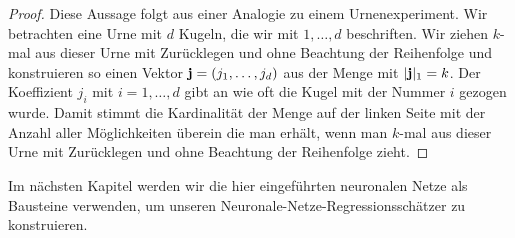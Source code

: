 \begin{proof}
Diese Aussage folgt aus einer Analogie zu einem Urnenexperiment. Wir betrachten eine Urne mit $d$ Kugeln, die wir mit $1,\dots,d$ beschriften. Wir ziehen $k$-mal aus dieser Urne mit Zurücklegen und ohne Beachtung der Reihenfolge und konstruieren so einen Vektor $\mathbf{j} = (j_1,\dots,j_d)$ aus der Menge mit $|\mathbf{j}|_1 = k$. Der Koeffizient $j_i$ mit $i= 1,\dots,d$ gibt an wie oft die Kugel mit der Nummer $i$ gezogen wurde. Damit stimmt die Kardinalität der Menge auf der linken Seite mit der Anzahl aller Möglichkeiten überein die man erhält, wenn man $k$-mal aus dieser Urne mit Zurücklegen und ohne Beachtung der Reihenfolge zieht.
\end{proof}

Im nächsten Kapitel werden wir die hier eingeführten neuronalen Netze als Bausteine verwenden, um unseren Neuronale-Netze-Regressionsschätzer zu konstruieren.